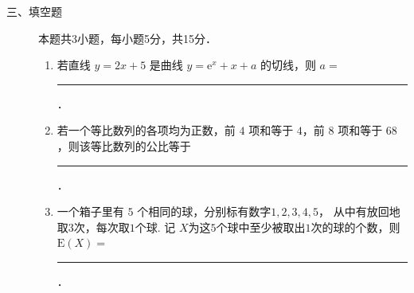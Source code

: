 \begin{description}
    \item[三、填空题] 本题共3小题，每小题5分，共15分．
    \begin{enumerate}[leftmargin=5pt]
      \addtocounter{enumi}{+11}
        \item 若直线 $y=2x+5$ 是曲线 $y=\mathrm{e}^x+x+a$ 的切线，则 $a=$ \rule[-0.3ex]{3em}{0.4pt}．
        \item 若一个等比数列的各项均为正数，前 $4$ 项和等于 $4$，前 $8$ 项和等于 $68$，则该等比数列的公比等于 \rule[-0.3ex]{3em}{0.4pt}．
        \item 一个箱子里有 $5$ 个相同的球，分别标有数字\(1,2,3,4,5\)，
        从中有放回地取\(3\)次，每次取\(1\)个球. 记 $X$为这\(5\)个球中至少被取出\(1\)次的球的个数，则 $\mathrm{E}(X)=$ \rule[-0.3ex]{3em}{0.4pt}．
    \end{enumerate}
\end{description}

